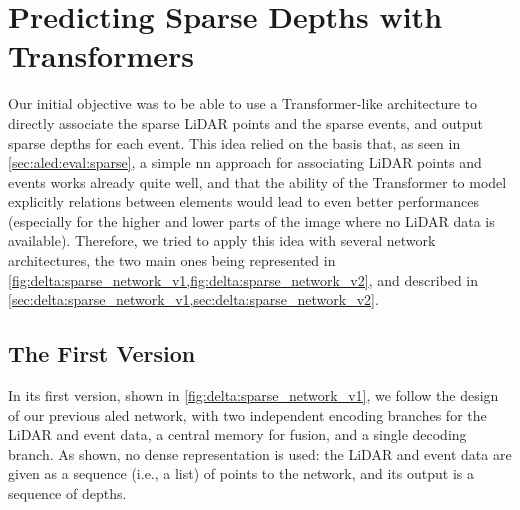 \section{Predicting Sparse Depths with Transformers}\label{sec:delta:sparse_network}
Our initial objective was to be able to use a Transformer-like architecture to directly associate the sparse LiDAR points and the sparse events, and output sparse depths for each event. This idea relied on the basis that, as seen in \cref{sec:aled:eval:sparse}, a simple \acrfull{nn} approach for associating LiDAR points and events works already quite well, and that the ability of the Transformer to model explicitly relations between elements would lead to even better performances (especially for the higher and lower parts of the image where no LiDAR data is available). Therefore, we tried to apply this idea with several network architectures, the two main ones being represented in \cref{fig:delta:sparse_network_v1,fig:delta:sparse_network_v2}, and described in \cref{sec:delta:sparse_network_v1,sec:delta:sparse_network_v2}.

\subsection{The First Version}\label{sec:delta:sparse_network_v1}

In its first version, shown in \cref{fig:delta:sparse_network_v1}, we follow the design of our previous \acrshort{aled} network, with two independent encoding branches for the LiDAR and event data, a central memory for fusion, and a single decoding branch. As shown, no dense representation is used: the LiDAR and event data are given as a sequence (i.e., a list) of points to the network, and its output is a sequence of depths.

